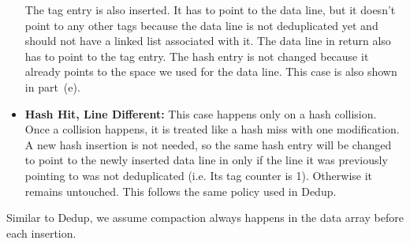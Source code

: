 \begin{itemize}
    The tag entry is also inserted. It has to point to the data line, but it doesn't point to any other tags because the data line is not deduplicated yet and should not have a linked list associated with it. The data line in return also has to point to the tag entry. The hash entry is not changed because it already points to the space we used for the data line. This case is also shown in part~(e).
    \item \textbf{Hash Hit, Line Different:} This case happens only on a hash collision. Once a collision happens, it is treated like a hash miss with one modification. A new hash insertion is not needed, so the same hash entry will be changed to point to the newly inserted data line in only if the line it was previously pointing to was not deduplicated (i.e. Its tag counter is 1). Otherwise it remains untouched. This follows the same policy used in Dedup.
\end{itemize}
Similar to Dedup, we assume compaction always happens in the data array before each insertion.
